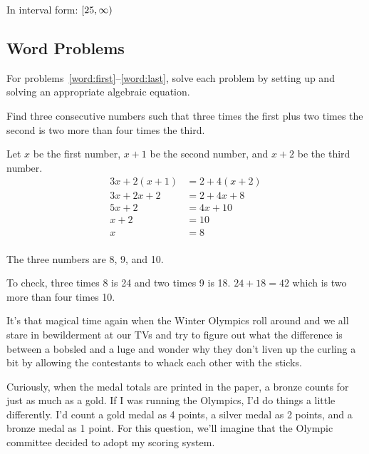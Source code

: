 \documentclass[letterpaper, landscape]{exam}
\begin{document}
\begin{questions}
\begin{solution}
      In interval form: $\intco{ 25, \infty }$
    \end{solution}

    \subsection{Word Problems}

    For problems~\ref{word:first}--\ref{word:last}, solve each problem by
    setting up and solving an appropriate algebraic equation.

    \question[10]\label{word:first}

      Find three consecutive numbers such that three times the first plus two
      times the second is two more than four times the third.

      \begin{solution}
        Let $x$ be the first number, $x + 1$ be the second number, and $x + 2$ be the third number.
        \begin{align*}
          3x + 2(x + 1) & = 2 + 4(x + 2) \\
          3x + 2x + 2   & = 2 + 4x + 8 \\
          5x + 2        & = 4x + 10 \\
          x + 2         & = 10 \\
          x             & = 8 \\
        \end{align*}

        The three numbers are 8, 9, and 10.  

        To check, three times 8 is 24 and two times 9 is 18.  $24 + 18 = 42$ which is two more than four times 10.
      \end{solution}

    \question[15]\label{word:last}
      It's that magical time again when the Winter Olympics roll around and we
      all stare in bewilderment at our TVs and try to figure out what the
      difference is between a bobsled and a luge and wonder why they don't liven
      up the curling a bit by allowing the contestants to whack each other with
      the sticks.

      Curiously, when the medal totals are printed in the paper, a bronze counts
      for just as much as a gold.  If I was running the Olympics, I'd do things a
      little differently.  I'd count a gold medal as 4 points, a silver medal as
      2 points, and a bronze medal as 1 point.  For this question, we'll imagine
      that the Olympic committee decided to adopt my scoring system.


\end{questions}
\end{document}

